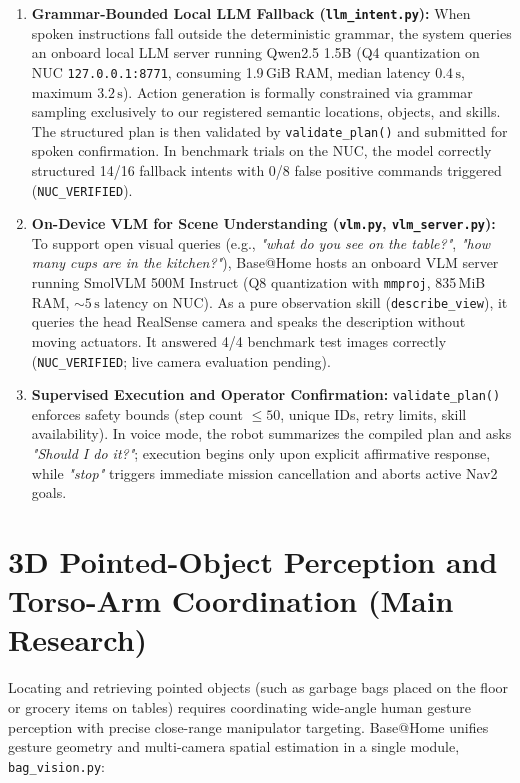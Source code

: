 \documentclass[runningheads,a4paper]{llncs}
\begin{document}
\begin{enumerate}
    \item \textbf{Grammar-Bounded Local LLM Fallback (\texttt{llm\_intent.py}):} When spoken instructions fall outside the deterministic grammar, the system queries an onboard local LLM server running Qwen2.5 1.5B (Q4 quantization on NUC \texttt{127.0.0.1:8771}, consuming 1.9\,GiB RAM, median latency $0.4\,\text{s}$, maximum $3.2\,\text{s}$). Action generation is formally constrained via grammar sampling exclusively to our registered semantic locations, objects, and skills. The structured plan is then validated by \texttt{validate\_plan()} and submitted for spoken confirmation. In benchmark trials on the NUC, the model correctly structured 14/16 fallback intents with 0/8 false positive commands triggered (\texttt{NUC\_VERIFIED}).

    \item \textbf{On-Device VLM for Scene Understanding (\texttt{vlm.py}, \texttt{vlm\_server.py}):} To support open visual queries (e.g., \textit{"what do you see on the table?"}, \textit{"how many cups are in the kitchen?"}), Base@Home hosts an onboard VLM server running SmolVLM 500M Instruct (Q8 quantization with \texttt{mmproj}, 835\,MiB RAM, $\sim 5\,\text{s}$ latency on NUC). As a pure observation skill (\texttt{describe\_view}), it queries the head RealSense camera and speaks the description without moving actuators. It answered 4/4 benchmark test images correctly (\texttt{NUC\_VERIFIED}; live camera evaluation pending).

    \item \textbf{Supervised Execution and Operator Confirmation:} \texttt{validate\_plan()} enforces safety bounds (step count $\le 50$, unique IDs, retry limits, skill availability). In voice mode, the robot summarizes the compiled plan and asks \textit{"Should I do it?"}; execution begins only upon explicit affirmative response, while \textit{"stop"} triggers immediate mission cancellation and aborts active Nav2 goals.
\end{enumerate}

\section{3D Pointed-Object Perception and Torso-Arm Coordination (Main Research)}
\label{sec:perception}
Locating and retrieving pointed objects (such as garbage bags placed on the floor or grocery items on tables) requires coordinating wide-angle human gesture perception with precise close-range manipulator targeting. Base@Home unifies gesture geometry and multi-camera spatial estimation in a single module, \texttt{bag\_vision.py}:
\end{document}
